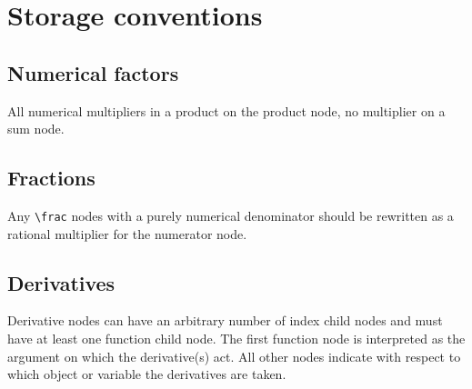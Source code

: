 
\section{Storage conventions}

\subsection{Numerical factors}

All numerical multipliers in a product on the product node, no
multiplier on a sum node.

\subsection{Fractions}

Any \verb|\frac| nodes with a purely numerical denominator should be
rewritten as a rational multiplier for the numerator node. 

\subsection{Derivatives}

Derivative nodes can have an arbitrary number of index child nodes and
must have at least one function child node. The first function node is
interpreted as the argument on which the derivative(s) act. All other
nodes indicate with respect to which object or variable the
derivatives are taken.

